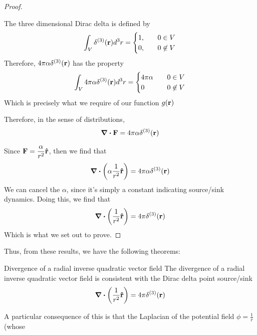 \begin{proof}
\begin{enumerate}
					The three dimensional Dirac delta is defined by 
					\begin{equation}
						\int_V \delta^{(3)}(\vb{r})\dd[3]r =
						\begin{cases}
							1,\quad &0\in V\\
							0,\quad &0\not\in V
						\end{cases}
					\end{equation}
					Therefore, $4\pi\alpha\delta^{(3)}(\vb{r})$ has the property
					\begin{equation}
						\int_V 4\pi \alpha \delta^{(3)}(\vb{r})\dd[3]r =
						\begin{cases}
							4\pi\alpha \quad & 0\in V\\
							0 &0\not\in V
						\end{cases}
					\end{equation}
					Which is precisely what we require of our function $g(\vb{r})$

					Therefore, in the sense of distributions,
					\begin{equation}
						\div\vb{F} = 4\pi\alpha \delta^{(3)}(\vb{r})
					\end{equation}
			\end{enumerate}
			Since $\vb{F}=\dfrac{\alpha}{r^2}\vu{r}$, then we find that
			\begin{equation}
				\div\qty(\alpha\frac{1}{r^2}\vu{r}) = 4\pi\alpha\delta^{(3)}(\vb{r})
			\end{equation}
			We can cancel the $\alpha$, since it's simply a constant indicating source/sink 
			dynamics. Doing this, we find that
			\begin{equation}
				\div(\frac{1}{r^2}\vu{r}) = 4\pi\delta^{(3)}(\vb{r})
			\end{equation}
			Which is what we set out to prove.
		\end{proof}
		\newpage
		Thus, from these results, we have the following theorems:
		\begin{theorem}{Divergence of a radial inverse quadratic vector field}
			The divergence of a radial inverse quadratic vector field
			is consistent with the Dirac delta point source/sink
			\begin{equation}\label{eq: divergence of inverse quadratic}
				\div(\frac{1}{r^2}\vu{r}) = 4\pi\delta^{(3)}(\vb{r})
			\end{equation}
		\end{theorem}
		A particular consequence of this is that the Laplacian of the potential field $\phi = \frac{1}{r}$ (whose
